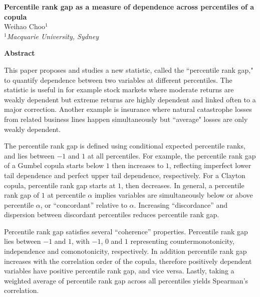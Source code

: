 
\setlength{\parindent}{0ex}
\setlength{\parskip}{2.5ex}
\setlength{\textwidth}{14.8cm}
\pagestyle{empty}


\begin{center}
{\large\bf Percentile rank gap as a measure of dependence across percentiles of a copula}\\

\vspace{0.5cm}
Weihao Choo$^1$\\

\vspace{0.5cm}
{\it  $^1$Macquarie University, Sydney}
\end{center}

\hrulefill

{\bf Abstract}

This paper proposes and studies a new statistic, called the ``percentile rank gap," to quantify  dependence between  two variables at different
percentiles.  The statistic is useful in for example stock markets where moderate returns are weakly dependent
 but extreme returns are highly dependent and linked often to a major correction. Another example is insurance where natural
catastrophe losses from related business lines happen simultaneously but ``average" losses are  only weakly dependent.

The percentile rank gap is defined using conditional expected percentile ranks, 
and lies between $-1$ and $1$ at all percentiles. For example, the percentile rank gap of a 
Gumbel copula starts below $1$ then increases to $1$,
reflecting imperfect lower tail dependence and perfect upper tail dependence, respectively.
For a Clayton copula, percentile rank gap starts at $1$, then decreases.
In general, a percentile rank gap of $1$ at percentile $\alpha$ implies variables are simultaneously below or above percentile $\alpha$, or
``concordant'' relative to $\alpha$.
Increasing ``discordance'' and dispersion between discordant percentiles reduces percentile rank gap.

Percentile rank gap satisfies several ``coherence'' properties.
Percentile rank gap lies between $-1$ and $1$, with $-1$, $0$ and $1$ representing countermonotonicity,
independence and comonotonicity, respectively.
In addition percentile rank gap increases with the correlation order of the copula,
 therefore positively dependent variables have positive percentile rank gap, and vice versa.
 Lastly, taking a weighted average of percentile rank gap across all percentiles yields Spearman's correlation.

